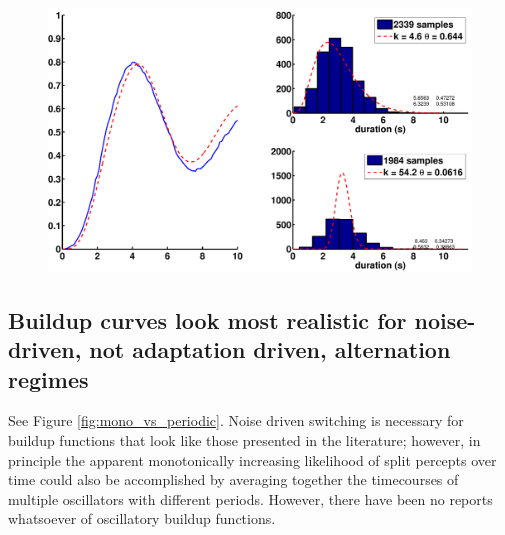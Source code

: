 \documentclass[10pt]{article}
\begin{document}
\begin{figure}[scale=0.5]
   \begin{center}
   \includegraphics[scale=0.33]{../reverse_fit_lownoise_hiadapt}   
   \caption{}
   	\label{fig:gam_to_BUF}
   \end{center}
\end{figure}
%


\subsection*{Buildup curves look most realistic for noise-driven, not adaptation driven, alternation regimes}
See Figure \ref{fig:mono_vs_periodic}. Noise driven switching is necessary for buildup functions that look like those presented in the literature; however, in principle the apparent monotonically increasing likelihood of split percepts over time could also be accomplished by averaging together the timecourses of multiple oscillators with different periods. However, there have been no reports whatsoever of oscillatory buildup functions.
\end{document}
